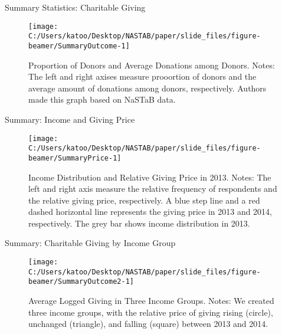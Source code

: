 \documentclass[
  ignorenonframetext,
  aspectratio=169,
]{beamer}
\begin{document}
\begin{frame}{Summary Statistics: Charitable Giving}
\protect\hypertarget{summary-statistics-charitable-giving}{}
\begin{figure}[t]

{\centering \texttt{[image: C:/Users/katoo/Desktop/NASTAB/paper/slide\_files/figure-beamer/SummaryOutcome-1]} 

}

\caption{Proportion of Donors and Average Donations among Donors. Notes: The left and right axises measure prooortion of donors and the average amount of donations among donors, respectively. Authors made this graph based on NaSTaB data.}\label{fig:SummaryOutcome}
\end{figure}
\end{frame}

\begin{frame}{Summary: Income and Giving Price}
\protect\hypertarget{summary-income-and-giving-price}{}
\begin{figure}[t]

{\centering \texttt{[image: C:/Users/katoo/Desktop/NASTAB/paper/slide\_files/figure-beamer/SummaryPrice-1]} 

}

\caption{Income Distribution and Relative Giving Price in 2013. Notes: The left and right axis measure the relative frequency of respondents and the relative giving price, respectively. A blue step line and a red dashed horizontal line represents the giving price in 2013 and 2014, respectively. The grey bar shows income distribution in 2013.}\label{fig:SummaryPrice}
\end{figure}
\end{frame}

\begin{frame}{Summary: Charitable Giving by Income Group}
\protect\hypertarget{summary-charitable-giving-by-income-group}{}
\begin{figure}[t]

{\centering \texttt{[image: C:/Users/katoo/Desktop/NASTAB/paper/slide\_files/figure-beamer/SummaryOutcome2-1]} 

}

\caption{Average Logged Giving in Three Income Groups. Notes: We created three income groups, with the relative price of giving rising (circle), unchanged (triangle), and falling (square) between 2013 and 2014.}\label{fig:SummaryOutcome2}
\end{figure}
\end{frame}
\end{document}

